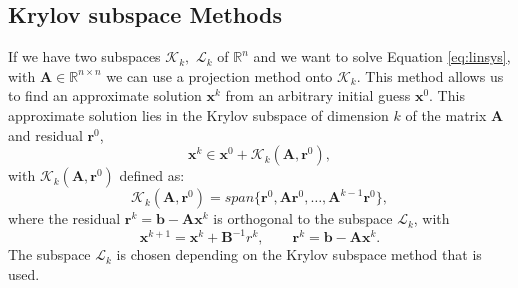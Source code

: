 \documentclass{ecmorXV}
\begin{document}
\subsection*{Krylov subspace Methods}
\hspace{0.5cm}If we have two subspaces $\mathcal{K}_k,$ $\mathcal{L}_k$ of $\mathbb{R}^n$ and we want to solve 
 Equation \eqref{eq:linsys}, 
with $\mathbf{A} \in \mathbb{R}^{n\times n}$ we can use a projection method onto $\mathcal{K}_k$.
This method allows us to find an approximate solution $\mathbf{x}^k$ from an arbitrary initial guess 
 $\mathbf{x}^0$. This approximate solution lies in the Krylov subspace of dimension $k$ 
of the matrix $\mathbf{A}$ and residual $\mathbf{r}^0$,
\begin{equation*}
\mathbf{x}^k \in \mathbf{x}^0+\mathcal{K}_k(\mathbf{A},\mathbf{r}^0),
\end{equation*}
with $\mathcal{K}_k(\mathbf{A},\mathbf{r}^0)$ defined as:
\begin{equation*}
\mathcal{K}_k(\mathbf{A},\mathbf{r}^0)=span\{\mathbf{r}^0,\mathbf{A}\mathbf{r}^0,\dots,\mathbf{A}^{k-1}\mathbf{r}^0\},
\end{equation*}
where the residual $\mathbf{r}^k=\mathbf{b}-\mathbf{A}\mathbf{x}^k$ is orthogonal to the subspace $\mathcal{L}_k$, with 
\begin{equation*}
 \mathbf{x}^{k+1}=\mathbf{x}^k+\mathbf{B}^{-1}r^k, \qquad \mathbf{r}^k=\mathbf{b}-\mathbf{A}\mathbf{x}^k.
\end{equation*}
The subspace $\mathcal{L}_k$ is chosen depending on the Krylov subspace method that is used.
\end{document}
